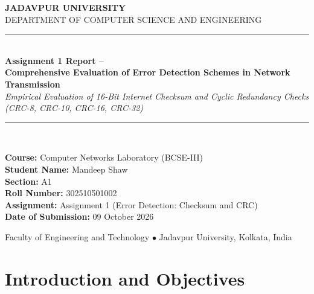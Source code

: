 \documentclass[11pt,a4paper]{article}
\begin{document}
\begin{titlepage}
    \centering
    \vspace*{1.5cm}
    
    {\Large \textbf{JADAVPUR UNIVERSITY}}\\[0.3cm]
    {\large DEPARTMENT OF COMPUTER SCIENCE AND ENGINEERING}\\[2.0cm]
    
    \rule{\linewidth}{1.2pt}\\[0.4cm]
    {\huge \textbf{Assignment 1 Report --}}\\[0.3cm]
    {\LARGE \textbf{Comprehensive Evaluation of Error Detection Schemes in Network Transmission}}\\[0.3cm]
    {\large \textit{Empirical Evaluation of 16-Bit Internet Checksum and Cyclic Redundancy Checks (CRC-8, CRC-10, CRC-16, CRC-32)}}\\[0.4cm]
    \rule{\linewidth}{1.2pt}\\[2.5cm]
    
    \begin{flushleft}
        \large
        \textbf{Course:} Computer Networks Laboratory (BCSE-III)\\[0.2cm]
        \textbf{Student Name:} Mandeep Shaw\\[0.2cm]
        \textbf{Section:} A1\\[0.2cm]
        \textbf{Roll Number:} 302510501002\\[0.2cm]
        \textbf{Assignment:} Assignment 1 (Error Detection: Checksum and CRC)\\[0.2cm]
        \textbf{Date of Submission:} 09 October 2026
    \end{flushleft}
    
    \vfill
    {\small Faculty of Engineering and Technology $\bullet$ Jadavpur University, Kolkata, India}
\end{titlepage}

\tableofcontents
\newpage

\section{Introduction and Objectives}
\end{document}
